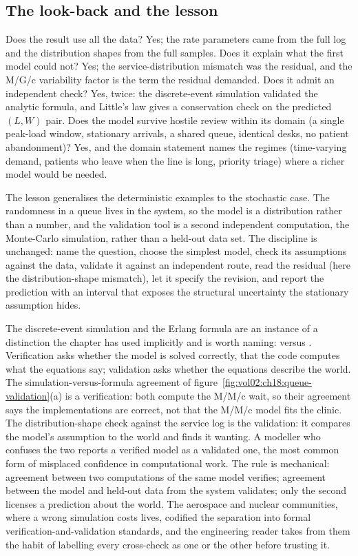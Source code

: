 \subsection{The look-back and the lesson}

Does the result use all the data? Yes; the rate parameters came from the
full log and the distribution shapes from the full samples. Does it
explain what the first model could not? Yes; the service-distribution
mismatch was the residual, and the M/G/c variability factor is the term
the residual demanded. Does it admit an independent check? Yes, twice: the
discrete-event simulation validated the analytic formula, and Little's law
gives a conservation check on the predicted $(L, W)$ pair. Does the model
survive hostile review within its domain (a single peak-load window,
stationary arrivals, a shared queue, identical desks, no patient
abandonment)? Yes, and the domain statement names the regimes (time-varying
demand, patients who leave when the line is long, priority triage) where a
richer model would be needed.

The lesson generalises the deterministic examples to the stochastic case.
The randomness in a queue lives in the system, so the model is a
distribution rather than a number, and the validation tool is a second
independent computation, the Monte-Carlo simulation, rather than a
held-out data set. The discipline is unchanged: name the question, choose
the simplest model, check its assumptions against the data, validate it
against an independent route, read the residual (here the
distribution-shape mismatch), let it specify the revision, and report the
prediction with an interval that exposes the structural uncertainty the
stationary assumption hides.

\begin{mastery}
The discrete-event simulation and the Erlang formula are an instance of a
distinction the chapter has used implicitly and is worth naming:
 versus . Verification asks
whether the model is solved correctly, that the code computes what the
equations say; validation asks whether the equations describe the world.
The simulation-versus-formula agreement of
figure~\ref{fig:vol02:ch18:queue-validation}(a) is a verification: both
compute the M/M/c wait, so their agreement says the implementations are
correct, not that the M/M/c model fits the clinic. The
distribution-shape check against the service log is the validation: it
compares the model's assumption to the world and finds it wanting. A
modeller who confuses the two reports a verified model as a validated one,
the most common form of misplaced confidence in computational work. The
rule is mechanical: agreement between two computations of the same model
verifies; agreement between the model and held-out data from the system
validates; only the second licenses a prediction about the world. The
aerospace and nuclear communities, where a wrong simulation costs lives,
codified the separation into formal verification-and-validation standards,
and the engineering reader takes from them the habit of labelling every
cross-check as one or the other before trusting it.
\end{mastery}


